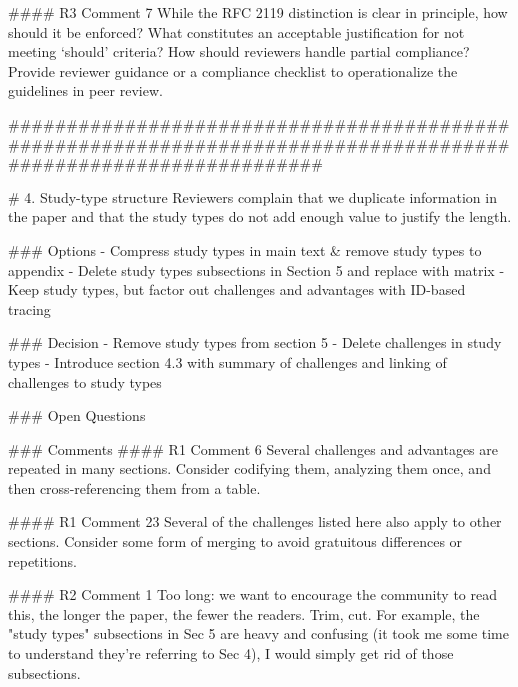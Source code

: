 #### R3 Comment 7
While the RFC 2119 distinction is clear in principle, how should it be enforced? What constitutes an acceptable justification for not meeting ‘should’ criteria? How should reviewers handle partial compliance? Provide reviewer guidance or a compliance checklist to operationalize the guidelines in peer review.


#################################################################################################################

# 4. Study-type structure
Reviewers complain that we duplicate information in the paper and that the study types do not add enough value to justify the length.

### Options
- Compress study types in main text \& remove study types to appendix
- Delete study types subsections in Section 5 and replace with matrix
- Keep study types, but factor out challenges and advantages with ID-based tracing

### Decision
- Remove study types from section 5
- Delete challenges in study types
- Introduce section 4.3 with summary of challenges and linking of challenges to study types

### Open Questions

### Comments
#### R1 Comment 6
Several challenges and advantages are repeated in many sections. Consider codifying them, analyzing them once, and then cross-referencing them from a table.

#### R1 Comment 23
Several of the challenges listed here also apply to other sections. Consider some form of merging to avoid gratuitous differences or repetitions.

#### R2 Comment 1
Too long: we want to encourage the community to read this, the longer the paper, the fewer the readers. Trim, cut. For example, the "study types" subsections in Sec 5 are heavy and confusing (it took me some time to understand they're referring to Sec 4), I would simply get rid of those subsections.